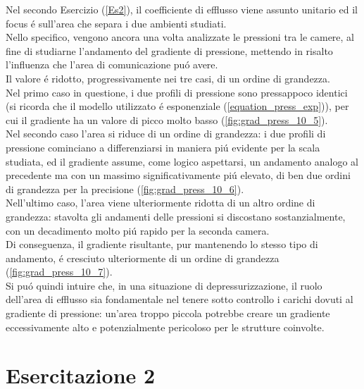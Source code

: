 \documentclass{article}
\begin{document}
        \clearpage

        
        Nel secondo Esercizio (\ref{Es2}), il coefficiente di efflusso viene assunto unitario
        ed il focus é sull'area che separa i due ambienti studiati.\\ 
        Nello specifico, vengono ancora una volta analizzate le pressioni tra le camere, 
        al fine di studiarne l'andamento del gradiente di pressione, 
        mettendo in risalto l'influenza che l'area di comunicazione puó avere.\\ 
        Il valore é ridotto, progressivamente nei tre casi,
        di un ordine di grandezza.\\ \linebreak
        Nel primo caso in questione, i due profili di pressione sono pressappoco identici (si ricorda che il modello utilizzato 
        é esponenziale (\ref{equation_press_exp})), per cui il gradiente ha un valore di picco molto basso (\ref{fig:grad_press_10_5}).\\ 
        Nel secondo caso l'area si riduce di un ordine di grandezza: i due profili
        di pressione cominciano a differenziarsi in maniera piú evidente per la scala studiata,
        ed il gradiente assume, come logico aspettarsi, un andamento analogo al precedente ma con un massimo significativamente
        piú elevato, di ben due ordini di grandezza per la precisione (\ref{fig:grad_press_10_6}).\\ 
        Nell'ultimo caso, l'area viene ulteriormente ridotta di un altro ordine di grandezza:
        stavolta gli andamenti delle pressioni si discostano sostanzialmente, con un decadimento
        molto piú rapido per la seconda camera.\\ 
        Di conseguenza, il gradiente risultante, pur mantenendo lo stesso tipo di 
        andamento, é cresciuto ulteriormente di un ordine di grandezza (\ref{fig:grad_press_10_7}).\\ 
        
    

        Si puó quindi intuire che, in una situazione di depressurizzazione, il ruolo dell'area di efflusso sia fondamentale
        nel tenere sotto controllo i carichi dovuti al gradiente di pressione: un'area troppo piccola
        potrebbe creare un gradiente eccessivamente alto e potenzialmente pericoloso per le
        strutture coinvolte.
        \clearpage
        \section{Esercitazione 2\label{Esercitazione_2}}
\end{document}

